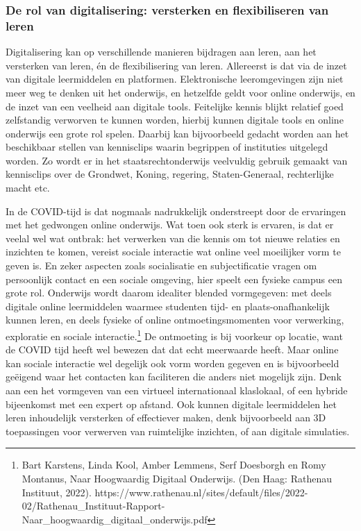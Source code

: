 \documentclass{jote-book}
\begin{document}
	\subsubsection{De rol van digitalisering: versterken en flexibiliseren van leren}



	Digitalisering kan op verschillende manieren bijdragen aan leren, aan het versterken van leren, én de flexibilisering van leren. Allereerst is dat via de inzet van digitale leermiddelen en platformen. Elektronische leeromgevingen zijn niet meer weg te denken uit het onderwijs, en hetzelfde geldt voor online onderwijs, en de inzet van een veelheid aan digitale tools. Feitelijke kennis blijkt relatief goed zelfstandig verworven te kunnen worden, hierbij kunnen digitale tools en online onderwijs een grote rol spelen. Daarbij kan bijvoorbeeld gedacht worden aan het beschikbaar stellen van kennisclips waarin begrippen of instituties uitgelegd worden. Zo wordt er in het staatsrechtonderwijs veelvuldig gebruik gemaakt van kennisclips over de Grondwet, Koning, regering, Staten-Generaal, rechterlijke macht etc.



	In de COVID-tijd is dat nogmaals nadrukkelijk onderstreept door de ervaringen met het gedwongen online onderwijs. Wat toen ook sterk is ervaren, is dat er veelal wel wat ontbrak: het verwerken van die kennis om tot nieuwe relaties en inzichten te komen, vereist sociale interactie wat online veel moeilijker vorm te geven is. En zeker aspecten zoals socialisatie en subjectificatie vragen om persoonlijk contact en een sociale omgeving, hier speelt een fysieke campus een grote rol. Onderwijs wordt daarom idealiter blended vormgegeven: met deels digitale online leermiddelen waarmee studenten tijd- en plaats-onafhankelijk kunnen leren, en deels fysieke of online ontmoetingsmomenten voor verwerking, exploratie en sociale interactie.\footnote{Bart Karstens, Linda Kool, Amber Lemmens, Serf Doesborgh en Romy Montanus, Naar Hoogwaardig Digitaal Onderwijs. (Den Haag: Rathenau Instituut, 2022). https://www.rathenau.nl/sites/default/files/2022-02/Rathenau\_Instituut-Rapport-Naar\_hoogwaardig\_digitaal\_onderwijs.pdf } De ontmoeting is bij voorkeur op locatie, want de COVID tijd heeft wel bewezen dat dat echt meerwaarde heeft. Maar online kan sociale interactie wel degelijk ook vorm worden gegeven en is bijvoorbeeld geëigend waar het contacten kan faciliteren die anders niet mogelijk zijn. Denk aan een het vormgeven van een virtueel internationaal klaslokaal, of een hybride bijeenkomst met een expert op afstand. Ook kunnen digitale leermiddelen het leren inhoudelijk versterken of effectiever maken, denk bijvoorbeeld aan 3D toepassingen voor verwerven van ruimtelijke inzichten, of aan digitale simulaties.
\end{document}
